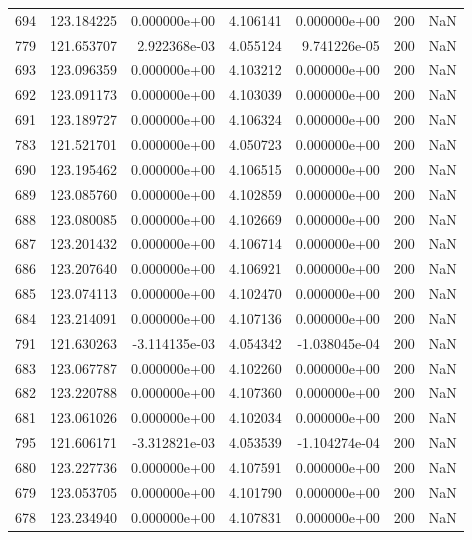 \begin{tabular}{rrrrrrr}
 694 & 123.184225 &  0.000000e+00 &  4.106141 &  0.000000e+00 &         200 & NaN \\
 779 & 121.653707 &  2.922368e-03 &  4.055124 &  9.741226e-05 &         200 & NaN \\
 693 & 123.096359 &  0.000000e+00 &  4.103212 &  0.000000e+00 &         200 & NaN \\
 692 & 123.091173 &  0.000000e+00 &  4.103039 &  0.000000e+00 &         200 & NaN \\
 691 & 123.189727 &  0.000000e+00 &  4.106324 &  0.000000e+00 &         200 & NaN \\
 783 & 121.521701 &  0.000000e+00 &  4.050723 &  0.000000e+00 &         200 & NaN \\
 690 & 123.195462 &  0.000000e+00 &  4.106515 &  0.000000e+00 &         200 & NaN \\
 689 & 123.085760 &  0.000000e+00 &  4.102859 &  0.000000e+00 &         200 & NaN \\
 688 & 123.080085 &  0.000000e+00 &  4.102669 &  0.000000e+00 &         200 & NaN \\
 687 & 123.201432 &  0.000000e+00 &  4.106714 &  0.000000e+00 &         200 & NaN \\
 686 & 123.207640 &  0.000000e+00 &  4.106921 &  0.000000e+00 &         200 & NaN \\
 685 & 123.074113 &  0.000000e+00 &  4.102470 &  0.000000e+00 &         200 & NaN \\
 684 & 123.214091 &  0.000000e+00 &  4.107136 &  0.000000e+00 &         200 & NaN \\
 791 & 121.630263 & -3.114135e-03 &  4.054342 & -1.038045e-04 &         200 & NaN \\
 683 & 123.067787 &  0.000000e+00 &  4.102260 &  0.000000e+00 &         200 & NaN \\
 682 & 123.220788 &  0.000000e+00 &  4.107360 &  0.000000e+00 &         200 & NaN \\
 681 & 123.061026 &  0.000000e+00 &  4.102034 &  0.000000e+00 &         200 & NaN \\
 795 & 121.606171 & -3.312821e-03 &  4.053539 & -1.104274e-04 &         200 & NaN \\
 680 & 123.227736 &  0.000000e+00 &  4.107591 &  0.000000e+00 &         200 & NaN \\
 679 & 123.053705 &  0.000000e+00 &  4.101790 &  0.000000e+00 &         200 & NaN \\
 678 & 123.234940 &  0.000000e+00 &  4.107831 &  0.000000e+00 &         200 & NaN \\

\end{tabular}
